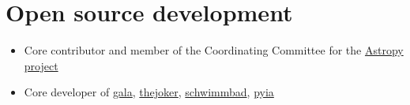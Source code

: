 \documentclass[12pt, letterpaper]{apw-cv}
\begin{document}
\begin{itemize}

\end{itemize}


\section*{Open source development \href{https://github.com/adrn}{\faGithub}}

\begin{itemize}

	\item Core contributor and member of the Coordinating Committee for the \href{http://www.astropy.org/}{Astropy project}
	\item Core developer of
        \href{http://gala.adrian.pw}{gala},
        \href{https://github.com/adrn/thejoker}{thejoker},
        \href{https://github.com/adrn/schwimmbad}{schwimmbad},
        \href{https://github.com/adrn/pyia}{pyia}

\end{itemize}
\end{document}
